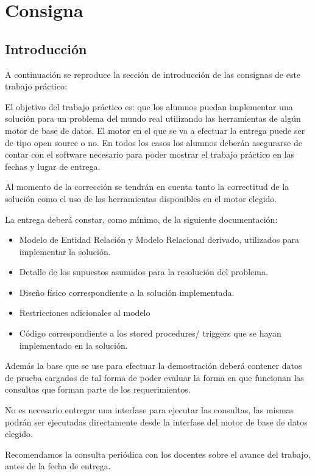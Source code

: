 \section{Consigna}

\subsection{Introducción}

A continuación se reproduce la sección de introducción de las consignas de
este trabajo práctico:

El objetivo del trabajo práctico es: que los alumnos puedan implementar una 
solución para un problema del mundo real utilizando las herramientas de algún 
motor de base de datos. El motor en el que se va a efectuar la entrega puede ser
de tipo open source o no. En todos los casos los alumnos deberán asegurarse de 
contar con el software necesario para poder mostrar el trabajo práctico en las 
fechas y lugar de entrega.

Al momento de la corrección se tendrán en cuenta tanto la correctitud de la 
solución como el uso de las herramientas disponibles en el motor elegido.

La entrega deberá constar, como mínimo, de la siguiente documentación:

\begin{itemize}
    \item  Modelo de Entidad Relación y Modelo Relacional derivado, utilizados 
        para implementar la solución.
    \item Detalle de los supuestos asumidos para la resolución del problema.
    \item Diseño físico correspondiente a la solución implementada.
    \item Restricciones adicionales al modelo
    \item Código correspondiente a los stored procedures/ triggers que se hayan 
    implementado en la solución.
\end{itemize}

Además la base que se use para efectuar la demostración deberá contener datos de
prueba cargados de tal forma de poder evaluar la forma en que funcionan las 
consultas que forman parte de los requerimientos.

No es necesario entregar una interfase para ejecutar las consultas, las mismas 
podrán ser ejecutadas directamente desde la interfase del motor de base de datos
elegido.

Recomendamos la consulta periódica con los docentes sobre el avance del trabajo, 
antes de la fecha de entrega.

